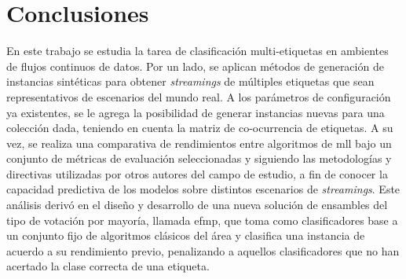 \chapter{Conclusiones}
\label{chapter:conclusiones}

En este trabajo se estudia la tarea de clasificación multi-etiquetas en
ambientes de flujos continuos de datos. Por un lado, se aplican métodos de
generación de instancias sintéticas para obtener \textit{streamings} de
múltiples etiquetas que sean representativos de escenarios del mundo real. A los
parámetros de configuración ya existentes, se le agrega la posibilidad de
generar instancias nuevas para una colección dada, teniendo en cuenta la matriz
de co-ocurrencia de etiquetas. A su vez, se realiza una comparativa de
rendimientos entre algoritmos de \acrshort{mll} bajo un conjunto de métricas de
evaluación seleccionadas y siguiendo las metodologías y directivas utilizadas
por otros autores del campo de estudio, a fin de conocer la capacidad predictiva
de los modelos sobre distintos escenarios de \textit{streamings}. Este análisis
derivó en el diseño y desarrollo de una nueva solución de ensambles del tipo de
votación por mayoría, llamada \acrshort{efmp}, que toma como clasificadores base
a un conjunto fijo de algoritmos clásicos del área y clasifica una instancia de
acuerdo a su rendimiento previo, penalizando a aquellos clasificadores que no
han acertado la clase correcta de una etiqueta.

